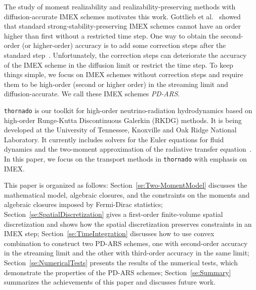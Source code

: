 The study of moment realizability and realizability-preserving methods with diffusion-accurate IMEX schemes motivates this work.
Gottlieb et al.~\cite{gottlieb_etal_2001} showed that standard strong-stability-preserving IMEX schemes cannot have an order higher than first without a restricted time step.
One way to obtain the second-order (or higher-order) accuracy is to add some correction steps after the standard step~\cite{huangShu_2017,hu_etal_2018}.
Unfortunately, the correction steps can deteriorate the accuracy of the IMEX scheme in the diffusion limit or restrict the time step.
To keep things simple, we focus on IMEX schemes without correction steps and require them to be high-order (second or higher order) in the streaming limit and diffusion-accurate.
We call these IMEX schemes \textit{PD-ARS}.

\texttt{thornado} is our toolkit for high-order neutrino-radiation hydrodynamics based on high-order Runge-Kutta Discontinuous Galerkin (RKDG) methods.
It is being developed at the University of Tennessee, Knoxville and Oak Ridge National Laboratory.
It currently includes solvers for the Euler equations for fluid dynamics and the two-moment approximation of the radiative transfer equation~\cite{endeve_etal_2018}.
In this paper, we focus on the transport methods in \texttt{thornado} with emphasis on IMEX.

This paper is organized as follows: Section~\ref{se:Two-MomentModel} discusses the mathematical model, algebraic closures, and the constraints on the moments and algebraic closures imposed by Fermi-Dirac statistics;
Section~\ref{se:SpatialDiscretization} gives a first-order finite-volume spatial discretization and shows how the spatial discretization preserves constraints in an IMEX step;
Section~\ref{se:TimeIntegration} discusses how to use convex combination to construct two PD-ARS schemes, one with second-order accuracy in the streaming limit and the other with third-order accuracy in the same limit;
Section~\ref{se:NumericalTests} presents the results of the numerical tests, which demonstrate the properties of the PD-ARS schemes; Section~\ref{se:Summary} summarizes the achievements of this paper and discusses future work.
